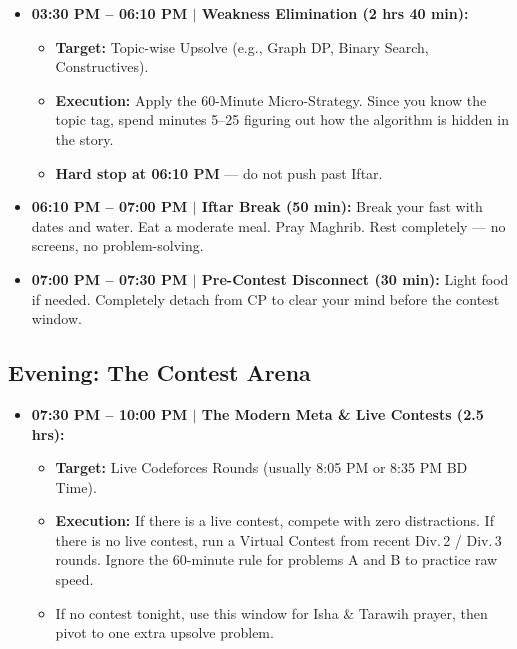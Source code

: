 \documentclass[12pt, a4paper]{article}
\begin{document}
\begin{itemize}[leftmargin=2em, itemsep=6pt]

  \item \textbf{03:30 PM -- 06:10 PM $|$ Weakness Elimination (2 hrs 40 min):}
    \begin{itemize}
      \item \textbf{Target:} Topic-wise Upsolve
            (e.g., Graph DP, Binary Search, Constructives).
      \item \textbf{Execution:} Apply the 60-Minute Micro-Strategy. Since you
            know the topic tag, spend minutes 5--25 figuring out how the
            algorithm is hidden in the story.
      \item \textbf{Hard stop at 06:10 PM} --- do not push past Iftar.
    \end{itemize}

  \item \textbf{06:10 PM -- 07:00 PM $|$ Iftar Break (50 min):} Break your
        fast with dates and water. Eat a moderate meal. Pray Maghrib.
        Rest completely --- no screens, no problem-solving.

  \item \textbf{07:00 PM -- 07:30 PM $|$ Pre-Contest Disconnect (30 min):}
        Light food if needed. Completely detach from CP to clear your mind
        before the contest window.

\end{itemize}

\subsection{Evening: The Contest Arena}

\begin{itemize}[leftmargin=2em, itemsep=6pt]

  \item \textbf{07:30 PM -- 10:00 PM $|$ The Modern Meta \& Live Contests
        (2.5 hrs):}
    \begin{itemize}
      \item \textbf{Target:} Live Codeforces Rounds
            (usually 8:05 PM or 8:35 PM BD Time).
      \item \textbf{Execution:} If there is a live contest, compete with zero
            distractions. If there is no live contest, run a Virtual Contest
            from recent Div.\,2 / Div.\,3 rounds. Ignore the 60-minute rule
            for problems A and B to practice raw speed.
      \item If no contest tonight, use this window for Isha \& Tarawih
            prayer, then pivot to one extra upsolve problem.
    \end{itemize}

\end{itemize}
\end{document}
